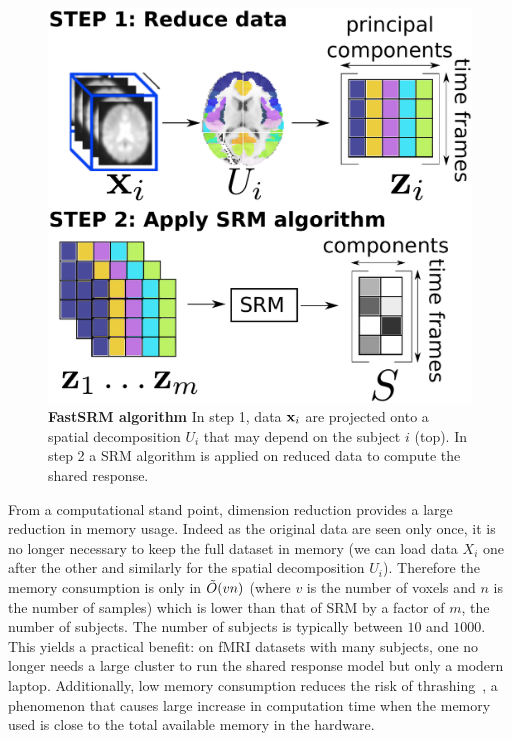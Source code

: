 \documentclass{article}
\begin{document}
\begin{figure}
  \centering
  \includegraphics[scale=0.34]{figures/srm/conceptual_figure2_revised.pdf}
  \caption{\textbf{FastSRM algorithm} In step 1, data $\mathbf{x}_i$ are projected onto a
    spatial decomposition $U_i$ that may depend on the subject $i$ (top).
    In step 2 a SRM algorithm is applied on reduced data to compute the shared
    response.
  }
  \label{fig:srm:conceptual}
\end{figure}

From a computational stand point, dimension reduction provides
a large reduction in memory usage.
%
Indeed as the original data are seen only
once, it is no longer necessary to keep the full dataset in memory (we can load
data $X_i$ one after the other and similarly for the spatial decomposition $U_i$).
%
Therefore
the memory consumption is only in $\tilde{O}(vn)$ (where $v$ is the number of voxels
and $n$ is the number of samples) which is lower than that of SRM by a factor of $m$,
the number of subjects.
%
The number of subjects is typically between $10$ and
$1000$.
%
This yields a practical benefit: on fMRI datasets with many subjects, one no
longer needs a large cluster to run the shared response model but only a modern
laptop.
%
Additionally, low memory consumption reduces the
risk of thrashing~\cite{denning1968thrashing}, a phenomenon that causes large
increase in computation time when the memory used is close to the total available
memory in the hardware.
%
\end{document}
